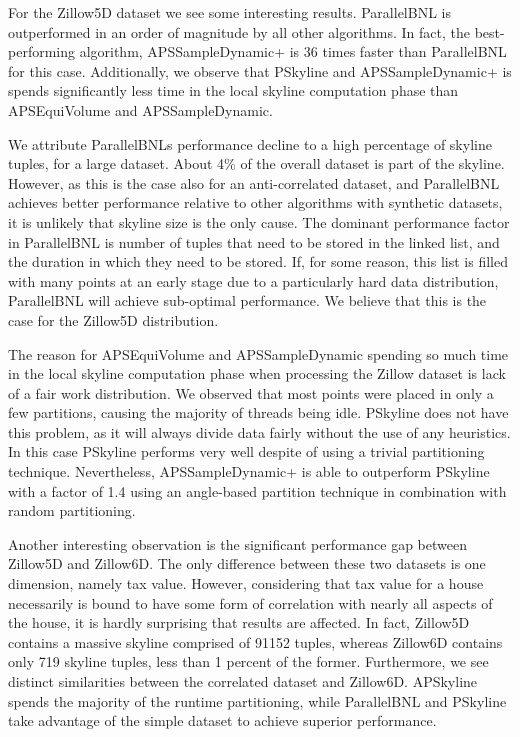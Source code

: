 \documentclass[12pt,a4paper,twoside]{report}
\begin{document}
For the Zillow5D dataset we see some interesting results. ParallelBNL
is outperformed in an order of magnitude by all other algorithms. In
fact, the best-performing algorithm, APSSampleDynamic+ is 36 times
faster than ParallelBNL for this case. Additionally, we observe that
PSkyline and APSSampleDynamic+ is spends significantly less time in
the local skyline computation phase than APSEquiVolume and
APSSampleDynamic.

We attribute ParallelBNLs performance decline to a high percentage of
skyline tuples, for a large dataset. About 4\% of the overall dataset is
part of the skyline. However, as this is the case also for an
anti-correlated dataset, and ParallelBNL achieves better performance
relative to other algorithms with synthetic datasets, it is unlikely
that skyline size is the only cause. The dominant performance factor
in ParallelBNL is number of tuples that need to be stored in the
linked list, and the duration in which they need to be stored. If, for
some reason, this list is filled with many points at an early stage
due to a particularly hard data distribution, ParallelBNL will achieve
sub-optimal performance. We believe that this is the case for the
Zillow5D distribution.

The reason for APSEquiVolume and APSSampleDynamic spending so much
time in the local skyline computation phase when processing the Zillow
dataset is lack of a fair work distribution. We observed that most
points were placed in only a few partitions, causing the majority of
threads being idle. PSkyline does not have this problem, as it will
always divide data fairly without the use of any heuristics. In this
case PSkyline performs very well despite of using a trivial
partitioning technique. Nevertheless, APSSampleDynamic+ is able to
outperform PSkyline with a factor of 1.4 using an angle-based
partition technique in combination with random partitioning.

Another interesting observation is the significant performance gap
between Zillow5D and Zillow6D. The only difference between these two
datasets is one dimension, namely tax value. However, considering that
tax value for a house necessarily is bound to have some form of
correlation with nearly all aspects of the house, it is hardly
surprising that results are affected. In fact, Zillow5D contains a
massive skyline comprised of 91152 tuples, whereas Zillow6D contains
only 719 skyline tuples, less than 1 percent of the former.
Furthermore, we see distinct similarities between the correlated
dataset and Zillow6D. APSkyline spends the majority of the runtime
partitioning, while ParallelBNL and PSkyline take advantage of the
simple dataset to achieve superior performance.
\end{document}
